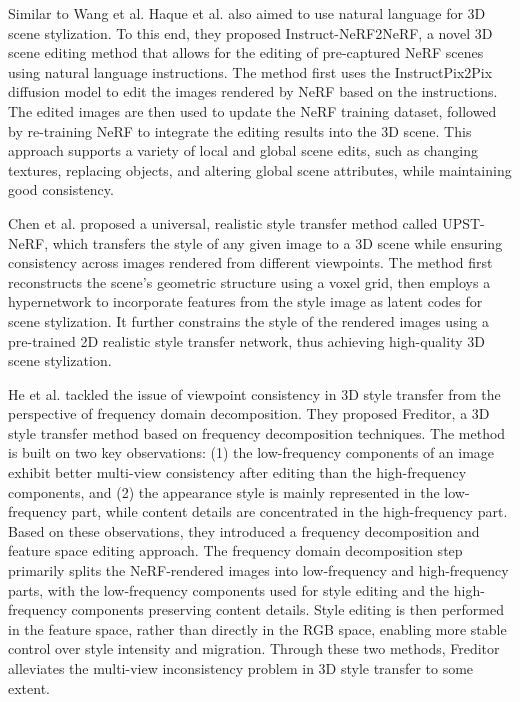 \documentclass[preprint,12pt]{elsarticle}
\begin{document}
Similar to Wang et al.\citep{94wang2023nerf}  Haque et al.\citep{95haque2023instruct} also aimed to use natural language for 3D scene stylization. To this end, they proposed Instruct-NeRF2NeRF, a novel 3D scene editing method that allows for the editing of pre-captured NeRF scenes using natural language instructions. The method first uses the InstructPix2Pix diffusion model to edit the images rendered by NeRF based on the instructions. The edited images are then used to update the NeRF training dataset, followed by re-training NeRF to integrate the editing results into the 3D scene. This approach supports a variety of local and global scene edits, such as changing textures, replacing objects, and altering global scene attributes, while maintaining good consistency.

Chen et al.\citep{92chen2024upst} proposed a universal, realistic style transfer method called UPST-NeRF, which transfers the style of any given image to a 3D scene while ensuring consistency across images rendered from different viewpoints. The method first reconstructs the scene's geometric structure using a voxel grid, then employs a hypernetwork to incorporate features from the style image as latent codes for scene stylization. It further constrains the style of the rendered images using a pre-trained 2D realistic style transfer network, thus achieving high-quality 3D scene stylization.

He et al.\citep{111he2025freditor} tackled the issue of viewpoint consistency in 3D style transfer from the perspective of frequency domain decomposition. They proposed Freditor, a 3D style transfer method based on frequency decomposition techniques. The method is built on two key observations: (1) the low-frequency components of an image exhibit better multi-view consistency after editing than the high-frequency components, and (2) the appearance style is mainly represented in the low-frequency part, while content details are concentrated in the high-frequency part. Based on these observations, they introduced a frequency decomposition and feature space editing approach. The frequency domain decomposition step primarily splits the NeRF-rendered images into low-frequency and high-frequency parts, with the low-frequency components used for style editing and the high-frequency components preserving content details. Style editing is then performed in the feature space, rather than directly in the RGB space, enabling more stable control over style intensity and migration. Through these two methods, Freditor alleviates the multi-view inconsistency problem in 3D style transfer to some extent.
\end{document}
